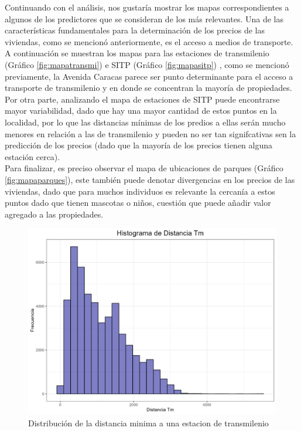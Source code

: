 \documentclass[12pt]{article}
\begin{document}
Continuando con el análisis, nos gustaría mostrar los mapas correspondientes a algunos de los predictores que se consideran de los más relevantes. Una de las características fundamentales para la determinación de los precios de las viviendas, como se mencionó anteriormente, es el acceso a medios de transporte. A continuación se muestran los mapas para las estaciones de transmilenio (Gráfico \ref{fig:mapatransmi}) e SITP (Gráfico \ref{fig:mapasitp}) , como se mencionó previamente, la Avenida Caracas parece ser punto determinante para el acceso a transporte de transmilenio y en donde se concentran la mayoría de propiedades. Por otra parte, analizando el mapa de estaciones de SITP puede encontrarse mayor variabilidad, dado que hay una mayor cantidad de estos puntos en la localidad, por lo que las distancias mínimas de los predios a ellas serán mucho menores en relación a las de transmilenio y pueden no ser tan signifcativas sen la predicción de los precios (dado que la mayoría de los precios tienen alguna estación cerca). \\

Para finalizar, es preciso observar el mapa de ubicaciones de parques (Gráfico \ref{fig:mapaparques}), este también puede denotar divergencias en los precios de las viviendas, dado que para muchos individuos es relevante la cercanía a estos puntos dado que tienen mascotas o niños, cuestión que puede añadir valor agregado a las propiedades.\\

\begin{figure}[H]
\centering
\includegraphics[scale=0.8]{../views/graficas_descriptivas/histograma_distancia_tm.png}
\centering
\caption{Distribución de la distancia minima a una estacion de transmilenio}
\label{fig:distribucion_tm}
\end{figure}
\end{document}
